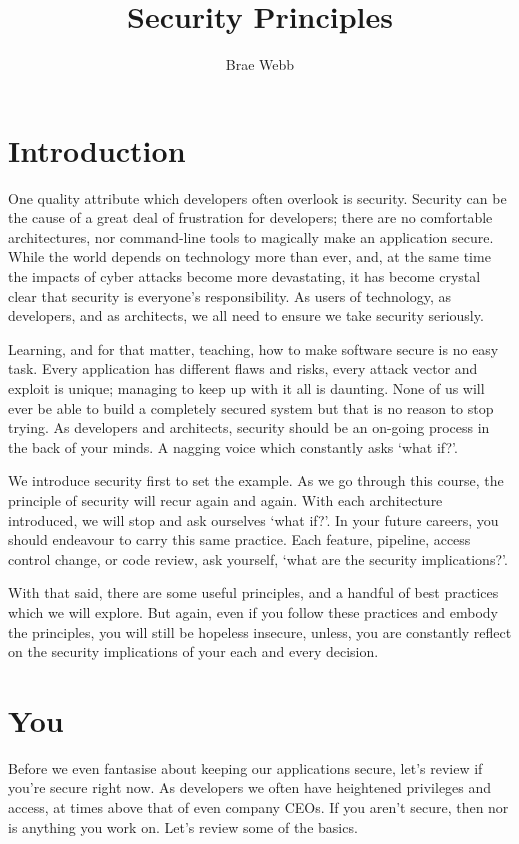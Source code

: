 \title{Security Principles}
\author{Brae Webb}
\date{}

\maketitle

\section{Introduction}

One quality attribute which developers often overlook is security.
Security can be the cause of a great deal of frustration for developers;
there are no comfortable architectures, nor command-line tools to magically make an application secure.
While the world depends on technology more than ever, and, at the same time the impacts of cyber attacks become more devastating,
it has become crystal clear that security is everyone's responsibility.
As users of technology, as developers, and as architects, we all need to ensure we take security seriously.

Learning, and for that matter, teaching, how to make software secure is no easy task.
Every application has different flaws and risks, every attack vector and exploit is unique; managing to keep up with it all is daunting.
None of us will ever be able to build a completely secured system but that is no reason to stop trying.
As developers and architects, security should be an on-going process in the back of your minds.
A nagging voice which constantly asks `what if?'.

We introduce security first to set the example.
As we go through this course, the principle of security will recur again and again.
With each architecture introduced, we will stop and ask ourselves `what if?'.
In your future careers, you should endeavour to carry this same practice.
Each feature, pipeline, access control change, or code review, ask yourself, `what are the security implications?'.

With that said, there are some useful principles, and a handful of best practices which we will explore.
But again, even if you follow these practices and embody the principles,
you will still be hopeless insecure, unless,
you are constantly reflect on the security implications of your each and every decision.

\section{You}
Before we even fantasise about keeping our applications secure, let's review if you're secure right now.
As developers we often have heightened privileges and access, at times above that of even company CEOs.
If you aren't secure, then nor is anything you work on.
Let's review some of the basics.

